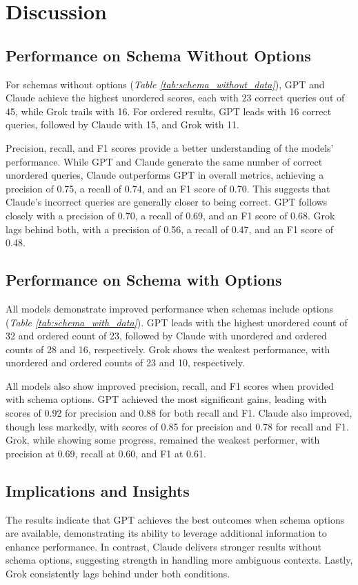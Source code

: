 \section{Discussion}

\subsection{Performance on Schema Without Options}
For schemas without options (\textit{Table \ref{tab:schema_without_data}}), GPT and Claude achieve the highest unordered scores, each with 23 correct queries out of 45, while Grok trails with 16. For ordered results, GPT leads with 16 correct queries, followed by Claude with 15, and Grok with 11.

Precision, recall, and F1 scores provide a better understanding of the models' performance. While GPT and Claude generate the same number of correct unordered queries, Claude outperforms GPT in overall metrics, achieving a precision of 0.75, a recall of 0.74, and an F1 score of 0.70. This suggests that Claude's incorrect queries are generally closer to being correct. GPT follows closely with a precision of 0.70, a recall of 0.69, and an F1 score of 0.68. Grok lags behind both, with a precision of 0.56, a recall of 0.47, and an F1 score of 0.48.

\subsection{Performance on Schema with Options}
All models demonstrate improved performance when schemas include options (\textit{Table \ref{tab:schema_with_data}}). GPT leads with the highest unordered count of 32 and ordered count of 23, followed by Claude with unordered and ordered counts of 28 and 16, respectively. Grok shows the weakest performance, with unordered and ordered counts of 23 and 10, respectively.

All models also show improved precision, recall, and F1 scores when provided with schema options. GPT achieved the most significant gains, leading with scores of 0.92 for precision and 0.88 for both recall and F1. Claude also improved, though less markedly, with scores of 0.85 for precision and 0.78 for recall and F1. Grok, while showing some progress, remained the weakest performer, with precision at 0.69, recall at 0.60, and F1 at 0.61.

\subsection{Implications and Insights}
The results indicate that GPT achieves the best outcomes when schema options are available, demonstrating its ability to leverage additional information to enhance performance. In contrast, Claude delivers stronger results without schema options, suggesting strength in handling more ambiguous contexts. Lastly, Grok consistently lags behind under both conditions.

